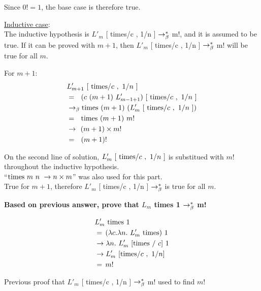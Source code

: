 \documentclass{article}
\begin{document}
\begin{Large}
		Since $0! = 1$, the base case is therefore true.
		\newline
		
		\underline{Inductive case}: \\
		
		The inductive hypothesis is $L'_m$ [ times/c , 1/n ] $\rightarrow_\beta^*$  m!, and it is assumed to be true.
		If it can be proved with $m+1$, then $L'_m$ [ times/c , 1/n ] $\rightarrow_\beta^*$  m! will be true for all $m$.
		
		For $m+1$:
		\begin{align*}
			&L_{m+1}^\prime \ [\ \tim / c \ , \ 1/n \ ] \\
			&= \saq (c \ (m+1) \ L_{m-1+1}^\prime ) \ [\ \tim / c \ , \ 1/n \ ] \\
			&\equals \tim \ (m+1) \ ( L_m^\prime \ [\ \tim / c \ , \ 1/n \ ]) \\
			&= \saq \tim \ (m+1) \ m! \\
			&\rightarrow \: \, (m+1) \times  m! \\
			&= \saq (m+1)!
		\end{align*}
		
		On the second line of solution, $L_m^\prime \ [\ \text{times} / c \ , \ 1/n \ ]$ is substitued with $m!$ throughout the inductive hypothesis. \\
		
		``$\text{times} \ m \ n \ \rightarrow n \times m$'' was also used for this part. \\
		
		True for $m+1$, therefore $L'_m$ [ times/c , 1/n ] $\rightarrow_\beta^*$ is true for all $m$. \\
		\newline
		
		\textbf{Based on previous answer, prove that $L_m$ times 1  $\rightarrow_\beta^*$ m!}
		
		\begin{align*}
			&L_m^\prime \ \text{times} \ 1 \\
			&= \, (\lambda c.\lambda n. \ L_m^\prime \ \text{times}) \ 1 \\
			&\rightarrow \lambda n. \ L_m^\prime \ [\text{times} \ / \ c] \ 1 \\
			&\rightarrow L_m^\prime \ [\text{times} /c \ , \ 1/n] \\
			&= \, m!
		\end{align*}
		
		Previous proof that $L'_m$ [ times/c , 1/n ] $\rightarrow_\beta^*$  m! used to find $m!$
	\end{Large}
	\newpage
	
\end{document}
